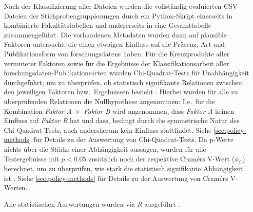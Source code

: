 Nach der Klassifizierung aller Dateien wurden die vollständig evaluierten CSV-Dateien der Stichprobengruppierungen durch ein Python-Skript \autocite{my-dataset} einerseits in kombinierte Fakultätstabellen und andererseits in eine Gesamttabelle zusammengeführt.
Die vorhandenen Metadaten wurden dann auf plausible Faktoren untersucht, die einen etwaigen Einfluss auf die Präsenz, Art und Publikationsform von \glspl{forschungsdaten} haben.
Für die Kreuzprodukte aller vermuteter Faktoren sowie für die Ergebnisse der Klassifikationsarbeit aller \gls{forschungsdaten}-Publikationsarten wurden Chi-Quadrat-Tests für Unabhängigkeit durchgeführt, um zu überprüfen, ob statistisch signifikante Relationen zwischen den jeweiligen Faktoren bzw.~Ergebnissen besteht \autocite{Pearson1900,Pearson1904}.
Hierbei wurden für alle zu überprüfenden Relationen die Nullhypothese angenommen:
I.e.~für die Kombination \textit{Faktor A}~$\times$~\textit{Faktor B} wird angenommen, dass \textit{Faktor A} keinen Einfluss auf \textit{Faktor B} hat und dass, bedingt durch die symmetrische Natur des Chi-Quadrat-Tests, auch andersherum kein Einfluss stattfindet.
Siehe \cref{sec:policy-methods} für Details zu der Auswertung von Chi-Quadrat-Tests.
Da p-Werte nichts über die Stärke einer Abhängigkeit aussagen, wurden für alle Testergebnisse mit $p<\num{0,05}$ zusätzlich noch der respektive Cramérs V-Wert ($\phi_C$) berechnet, um zu überprüfen, wie stark die statistisch signifikante Abhängigkeit ist \autocite{Cramer1946}.
Siehe \cref{sec:policy-methods} für Details zu der Auswertung von Cramérs V-Werten.

Alle statistischen Auswertungen wurden via \textit{R} ausgeführt \autocite{r,dplyr,my-dataset}.

